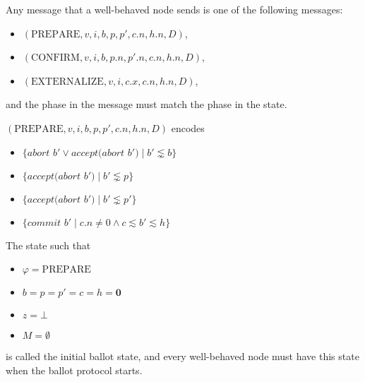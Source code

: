 \begin{defn}
    Any message that a well-behaved node sends is one of the following messages:
    \begin{itemize}
        \item
            $(\text{PREPARE}, v, i, b, p, p', c.n, h.n, D)$,
        \item
            $(\text{CONFIRM}, v, i, b, p.n, p'.n, c.n, h.n, D)$,
        \item
            $(\text{EXTERNALIZE}, v, i, c.x, c.n, h.n, D)$,
    \end{itemize}
    and the phase in the message must match the phase in the state.
\end{defn}

\begin{defn}[PREPARE]
    $(\text{PREPARE}, v, i, b, p, p', c.n, h.n, D)$ encodes
    \begin{itemize}
        \item
            $\{ \textit{abort } b' \lor \textit{accept(abort $b'$)} \mid b' \lnsim b \}$
        \item
            $\{ \textit{accept(abort $b'$)} \mid b' \lnsim p \}$
        \item
            $\{ \textit{accept(abort $b'$)} \mid b' \lnsim p' \}$
        \item
            $\{ \textit{commit } b' \mid c.n \ne 0 \land c \lesssim b' \lesssim h \}$
    \end{itemize}
\end{defn}


\begin{defn}\label{Initial Ballot State}
    The state such that
    \begin{itemize}
        \item
            $\varphi = \text{PREPARE}$
        \item
            $b = p = p' = c = h = \textbf{0}$
        \item
            $z = \bot$
        \item
            $M = \emptyset$
    \end{itemize}
    is called the initial ballot state, and every well-behaved node must have this state when the ballot protocol starts.
\end{defn}

